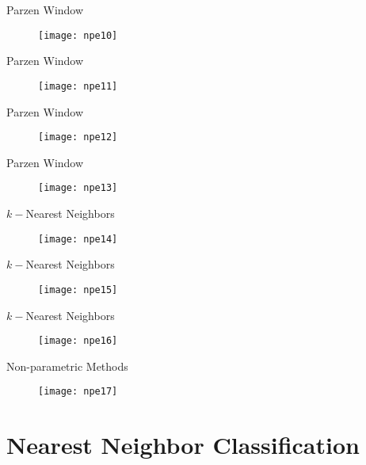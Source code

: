 \begin{frame}{Parzen Window}
\begin{figure}
\texttt{[image: npe10]}
\end{figure}
\end{frame}
\begin{frame}{Parzen Window}
\begin{figure}
\texttt{[image: npe11]}
\end{figure}
\end{frame}

\begin{frame}{Parzen Window}
\begin{figure}
\texttt{[image: npe12]}
\end{figure}
\end{frame}

\begin{frame}{Parzen Window}
\vspace{-0.2cm}
\begin{figure}
\texttt{[image: npe13]}
\end{figure}
\end{frame}

\begin{frame}{$k-$Nearest Neighbors}
\begin{figure}
\texttt{[image: npe14]}
\end{figure}
\end{frame}

\begin{frame}{$k-$Nearest Neighbors}
\begin{figure}
\texttt{[image: npe15]}
\end{figure}
\end{frame}

\begin{frame}{$k-$Nearest Neighbors}
\begin{figure}
\texttt{[image: npe16]}
\end{figure}
\end{frame}

\begin{frame}{Non-parametric Methods}
\begin{figure}
\texttt{[image: npe17]}
\end{figure}
\end{frame}

\section{Nearest Neighbor Classification}
